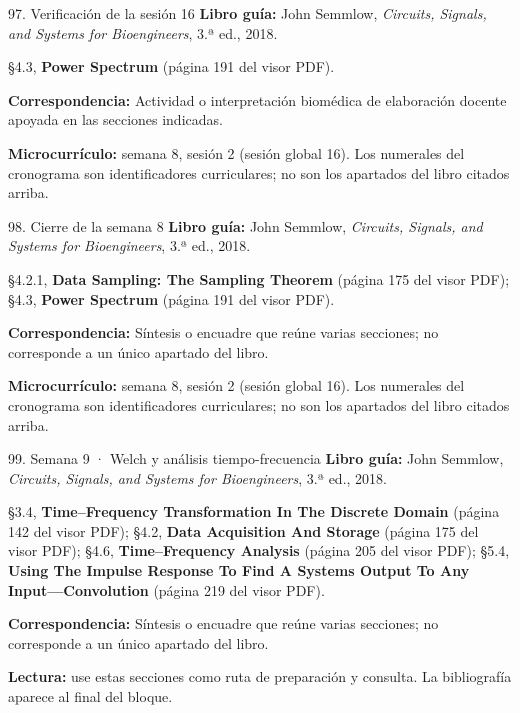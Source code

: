 \documentclass[
  10pt,
  ignorenonframetext,
  aspectratio=169,
  spanish,
]{beamer}
\begin{document}
\begin{frame}{97. Verificación de la sesión 16}
\label{verificaciuxf3n-de-la-sesiuxf3n-16}
\textbf{Libro guía:} John Semmlow, \emph{Circuits, Signals, and Systems
for Bioengineers}, 3.ª ed., 2018.

§4.3, \textbf{Power Spectrum} (página 191 del visor PDF).

\textbf{Correspondencia:} Actividad o interpretación biomédica de
elaboración docente apoyada en las secciones indicadas.

\textbf{Microcurrículo:} semana 8, sesión 2 (sesión global 16). Los
numerales del cronograma son identificadores curriculares; no son los
apartados del libro citados arriba.
\end{frame}

\begin{frame}{98. Cierre de la semana 8}
\label{cierre-de-la-semana-8}
\textbf{Libro guía:} John Semmlow, \emph{Circuits, Signals, and Systems
for Bioengineers}, 3.ª ed., 2018.

§4.2.1, \textbf{Data Sampling: The Sampling Theorem} (página 175 del
visor PDF); §4.3, \textbf{Power Spectrum} (página 191 del visor PDF).

\textbf{Correspondencia:} Síntesis o encuadre que reúne varias
secciones; no corresponde a un único apartado del libro.

\textbf{Microcurrículo:} semana 8, sesión 2 (sesión global 16). Los
numerales del cronograma son identificadores curriculares; no son los
apartados del libro citados arriba.
\end{frame}

\begin{frame}{99. Semana 9 · Welch y análisis tiempo-frecuencia}
\label{semana-9-welch-y-anuxe1lisis-tiempo-frecuencia}
\textbf{Libro guía:} John Semmlow, \emph{Circuits, Signals, and Systems
for Bioengineers}, 3.ª ed., 2018.

§3.4, \textbf{Time--Frequency Transformation In The Discrete Domain}
(página 142 del visor PDF); §4.2, \textbf{Data Acquisition And Storage}
(página 175 del visor PDF); §4.6, \textbf{Time--Frequency Analysis}
(página 205 del visor PDF); §5.4, \textbf{Using The Impulse Response To
Find A Systems Output To Any Input---Convolution} (página 219 del visor
PDF).

\textbf{Correspondencia:} Síntesis o encuadre que reúne varias
secciones; no corresponde a un único apartado del libro.

\textbf{Lectura:} use estas secciones como ruta de preparación y
consulta. La bibliografía aparece al final del bloque.
\end{frame}
\end{document}
